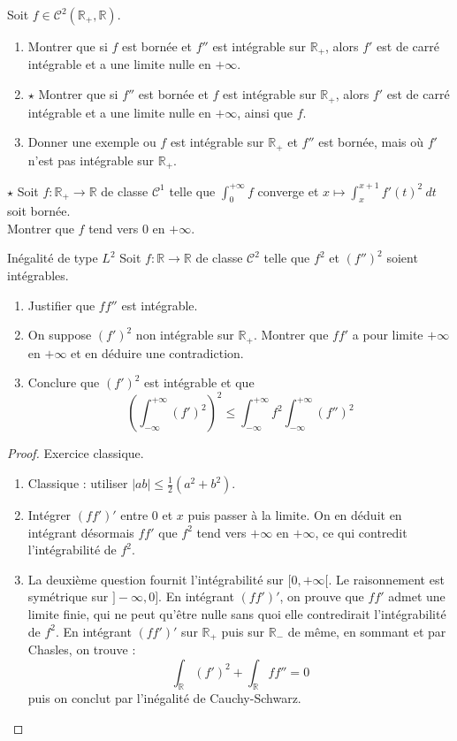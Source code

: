 \documentclass[french,a4paper]{article}
\newcommand{\R}{\mathbb{R}}
\theoremstyle{plain}
\theoremstyle{definition}
\theoremstyle{remark}
\begin{document}
\begin{ex}[Moulin.IG.44]{}
	Soit $f\in\mathcal{C}^2(\R_+,\R)$.
	\begin{enumerate}
		\item Montrer que si $f$ est bornée et $f''$ est intégrable sur $\R_+$, alors $f'$ est de carré intégrable et a une limite nulle en $+\infty$.
		\item $\star$ Montrer que si $f''$ est bornée et $f$ est intégrable sur $\R_+$, alors $f'$ est de carré intégrable et a une limite nulle en $+\infty$, ainsi que $f$.
		\item Donner une exemple ou $f$ est intégrable sur $\R_+$ et $f''$ est bornée, mais où $f'$ n'est pas intégrable sur $\R_+$.
	\end{enumerate}
\end{ex}

\begin{ex}[Moulin.IG.45]{$\star$}
	Soit $f:\R_+\to\R$ de classe $\mathcal{C}^1$ telle que $\displaystyle\int_{0}^{+\infty}f$ converge et $x\mapsto\displaystyle\int_{x}^{x+1}f'(t)^2\ dt$ soit bornée. \\ Montrer que $f$ tend vers $0$ en $+\infty$.
\end{ex}

\begin{ex}[Châteaux]{Inégalité de type $L^2$}
	Soit $f:\R\to\R$ de classe $\mathcal{C}^2$ telle que $f^2$ et $(f'')^2$ soient intégrables. 
	\begin{enumerate}
		\item Justifier que $ff''$ est intégrable.
		\item On suppose $(f')^2$ non intégrable sur $\R_+$. Montrer que $ff'$ a pour limite $+\infty$ en $+\infty$ et en déduire une contradiction.
		\item Conclure que $(f')^2$ est intégrable et que $$\left(\int_{-\infty}^{+\infty}(f')^2\right)^2\leqslant\int_{-\infty}^{+\infty}f^2\int_{-\infty}^{+\infty}(f'')^2$$
	\end{enumerate}
\end{ex}
\begin{proof}
	Exercice classique.
	\begin{enumerate}
		\item Classique : utiliser $\lvert ab\rvert\leqslant\displaystyle\frac{1}{2}(a^2+b^2)$.
		\item Intégrer $(ff')'$ entre $0$ et $x$ puis passer à la limite. On en déduit en intégrant désormais $ff'$ que $f^2$ tend vers $+\infty$ en $+\infty$, ce qui contredit l'intégrabilité de $f^2$.
		\item La deuxième question fournit l'intégrabilité sur $[0,+\infty[$. Le raisonnement est symétrique sur $]-\infty,0]$. En intégrant $(ff')'$, on prouve que $ff'$ admet une limite finie, qui ne peut qu'être nulle sans quoi elle contredirait l'intégrabilité de $f^2$. En intégrant $(ff')'$ sur $\R_+$ puis sur $\R_-$ de même, en sommant et par Chasles, on trouve : $$\int_\R(f')^2+\int_\R ff''=0$$ puis on conclut par l'inégalité de Cauchy-Schwarz.
	\end{enumerate}
\end{proof}
\end{document}
